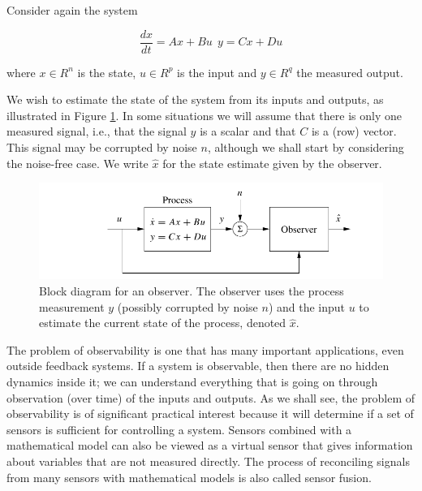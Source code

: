 Consider again the system

\begin{equation}
\frac{dx}{dt} = Ax + Bu ~~ y = Cx + Du
\end{equation}


where $x\in R^n$ is the state, $u\in R^{p}$ is the input and $y\in R^q$ the measured output.

We wish to estimate the state of the system from its inputs and outputs, as illustrated
in Figure \ref{observer_block_diagram}. In some situations we will assume that there is only one measured
signal, i.e., that the signal $y$ is a scalar and that $C$ is a (row) vector. This signal may
be corrupted by noise $n$, although we shall start by considering the noise-free case.
We write $\hat{x}$ for the state estimate given by the observer.



\begin{figure}[!htb]
\begin{center}
\includegraphics[scale=0.380]{img/output_feedback/observer_block_diagram.jpeg}
\end{center}
\caption{Block diagram for an observer. The observer uses the process measurement $y$
(possibly corrupted by noise $n$) and the input $u$ to estimate the current state of the process,
denoted $\hat{x}$.}
\label{observer_block_diagram}
\end{figure}


The problem of observability is one that has many important applications, even
outside feedback systems. If a system is observable, then there are no hidden dynamics inside it; we can understand everything that is going on through observation (over time) of the inputs and outputs. As we shall see, the problem of observability is of significant practical interest because it will determine if a set of sensors is
sufficient for controlling a system. Sensors combined with a mathematical model
can also be viewed as a virtual sensor that gives information about variables that
are not measured directly. The process of reconciling signals from many sensors
with mathematical models is also called sensor fusion.



